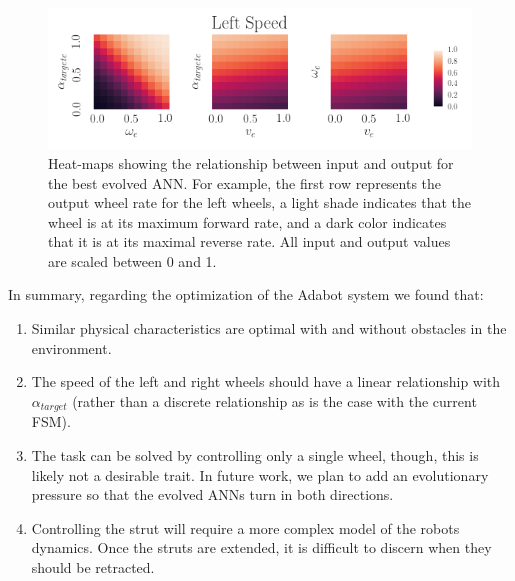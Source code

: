 \begin{figure}[!ht]
    \centering

    \vspace{-0.05in}

    \includegraphics[width=\columnwidth]{figures/4-results/ann_map.png}

    \vspace{-0.1in}

    \caption{Heat-maps showing the relationship between input and output for the best evolved ANN. For example, the first row represents the output wheel rate for the left wheels, a light shade indicates that the wheel is at its maximum forward rate, and a dark color indicates that it is at its maximal reverse rate. All input and output values are scaled between 0 and 1.}
    \label{fig:ANN-40-2-best-ann-map}


\end{figure}


In summary, regarding the optimization of the Adabot system we found that:

\begin{enumerate}

\item Similar physical characteristics are optimal with and without obstacles in the environment.

\item The speed of the left and right wheels should have a linear relationship with $\alpha_{\mathit{target}}$ (rather than a discrete relationship as is the case with the current FSM).

\item The task can be solved by controlling only a single wheel, though, this is likely not a desirable trait. In future work, we plan to add an evolutionary pressure so that the evolved ANNs turn in both directions.

\item Controlling the strut will require a more complex model of the robots dynamics. Once the struts are extended, it is difficult to discern when they should be retracted.

\end{enumerate}

